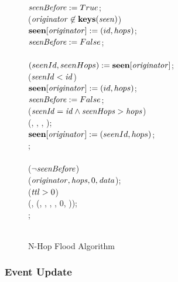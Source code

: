 \begin{figure}[H]
\begin{boxedminipage}{\linewidth}
    \null\qq\qq $\mbox{\emph{seenBefore}} \mathrel{:=} True$;\\
    \null\qq\qq {} ($\mbox{\emph{originator}} \not\in \mbox{\textbf{keys}}(\mbox{\emph{seen}}) $) \\
    \null\qq\qq\qq $\mbox{\textbf{seen}}[\mbox{\emph{originator}}] \mathrel{:=} (id, hops)$;\\
    \null\qq\qq\qq $\mbox{\emph{seenBefore}} \mathrel{:=} False$;\\
    \null\qq\qq {} \\
    \null\qq\qq\qq $(seenId, seenHops) \mathrel{:=} \mbox{\textbf{seen}}[\mbox{\emph{originator}}]$;\\
    \null\qq\qq\qq {} ($\mbox{\emph{seenId}} < \mbox{\emph{id}}$) \\
    \null\qq\qq\qq\qq $\mbox{\textbf{seen}}[\mbox{\emph{originator}}] \mathrel{:=} (id, hops)$;\\
    \null\qq\qq\qq\qq $\mbox{\emph{seenBefore}} \mathrel{:=} False$;\\
    \null\qq\qq\qq {} ($\mbox{\emph{seenId}} = \mbox{\emph{id}} \land \mbox{\emph{seenHops}} > \mbox{\emph{hops}}$) \\
    \null\qq\qq\qq\qq {}(, , , );\\
    \null\qq\qq\qq\qq $\mbox{\textbf{seen}}[\mbox{\emph{originator}}] \mathrel{:=} (seenId, hops)$;\\
    \null\qq\qq\qq {};\\
    \null\qq\qq {}\\
    \null\qq\qq {} ($\lnot\mbox{\emph{seenBefore}}$) \\
    \null\qq\qq\qq {}($\mbox{\emph{originator}}, \mbox{\emph{hops}}, 0, \mbox{\emph{data}}$);\\
    \null\qq\qq\qq {} ($\mbox{\emph{ttl}} > 0$) \\
    \null\qq\qq\qq\qq {}(, (, , , , 0, )); \\
    \null\qq\qq\qq {};\\
    \null\qq\qq {}\\
  \end{boxedminipage}
  \caption{N-Hop Flood Algorithm}
  \label{fig:n-hop-flood-algorithm}
\end{figure}

\subsubsection{Event Update}


